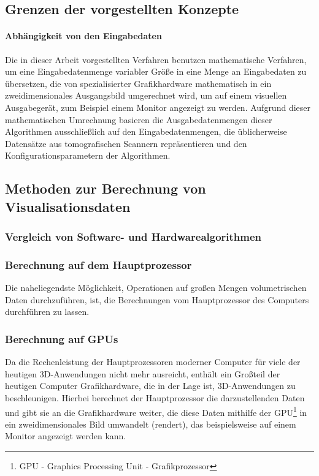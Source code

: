 \documentclass[a4paper,titlepage,12pt]{scrartcl}
\begin{document}
\subsection{Grenzen der vorgestellten Konzepte}\label{ssec:limits}
\paragraph{Abhängigkeit von den Eingabedaten}
Die in dieser Arbeit vorgestellten Verfahren benutzen mathematische Verfahren, um eine Eingabedatenmenge variabler Größe in eine Menge an Eingabedaten zu übersetzen, die von spezialisierter Grafikhardware mathematisch in ein zweidimensionales Ausgangsbild umgerechnet wird, um auf einem visuellen Ausgabegerät, zum Beispiel einem Monitor angezeigt zu werden. Aufgrund dieser mathematischen Umrechnung basieren die Ausgabedatenmengen dieser Algorithmen ausschließlich auf den Eingabedatenmengen, die üblicherweise Datensätze aus tomografischen Scannern repräsentieren und den Konfigurationsparametern der Algorithmen.
\subsection{Methoden zur Berechnung von Visualisationsdaten}
\subsubsection{Vergleich von Software- und Hardwarealgorithmen}\label{ssec:swhwcomparison}

\subsubsection{Berechnung auf dem Hauptprozessor}\label{sssec:cpucalculation}
Die naheliegendste Möglichkeit, Operationen auf großen Mengen volumetrischen Daten durchzuführen, ist, die Berechnungen vom Hauptprozessor des Computers durchführen zu lassen. 
\subsubsection{Berechnung auf GPUs}\label{sssec:gpucalculation}
Da die Rechenleistung der Hauptprozessoren moderner Computer für viele der heutigen 3D-Anwendungen nicht mehr ausreicht, enthält ein Großteil der heutigen Computer Grafikhardware, die in der Lage ist, 3D-Anwendungen zu beschleunigen. Hierbei berechnet der Hauptprozessor die darzustellenden Daten und gibt sie an die Grafikhardware weiter, die diese Daten mithilfe der GPU\footnote{GPU - Graphics Processing Unit - Grafikprozessor} in ein zweidimensionales Bild umwandelt (rendert), das beispielsweise auf einem Monitor angezeigt werden kann.
\end{document}
